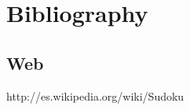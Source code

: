 \documentclass[11pt,fleqn]{book} %
\begin{document}

\chapter*{Bibliography}
\section*{Web}
http://es.wikipedia.org/wiki/Sudoku



\cleardoublepage
\setlength{\columnsep}{0.75cm}
\printindex

\end{document}
